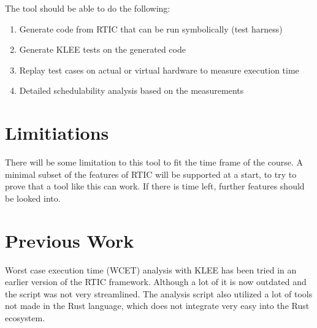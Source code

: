 The tool should be able to do the following:
%
\begin{enumerate}
    \item Generate code from RTIC that can be run symbolically (test harness)
    \item Generate KLEE tests on the generated code
    \item Replay test cases on actual or virtual hardware to measure execution time
    \item Detailed schedulability analysis based on the measurements
\end{enumerate}

\section{Limitiations}
There will be some limitation to this tool to fit the time frame of the course.
A minimal subset of the features of RTIC will be supported at a start, to try
to prove that a tool like this can work. If there is time left, further
features should be looked into.

\section{Previous Work}
Worst case execution time (WCET) analysis with KLEE has been tried in an earlier version of the RTIC framework\cite{lindner}.
Although a lot of it is now outdated and the script was not very streamlined. The analysis script also utilized a lot of tools not made in the Rust language, which does not integrate very easy into the Rust ecosystem.

